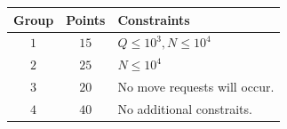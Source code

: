 
\begin{center}
\begin{tabular}{| c | c | l |}
  \hline
  \textbf{Group} & \textbf{Points} & \textbf{Constraints} \\ \hline
  $1$    & $15$  & $Q \le 10^3, N \le 10^4$ \\ \hline
  $2$    & $25$  & $N \le 10^4$ \\ \hline
  $3$    & $20$  & No move requests will occur. \\ \hline
  $4$    & $40$  & No additional constraits. \\ \hline
\end{tabular}
\end{center}
